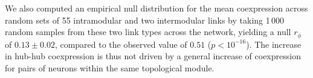 \documentclass[10pt,letterpaper]{article}
\begin{document}
We also computed an empirical null distribution for the mean coexpression across random sets of 55 intramodular and two intermodular links by taking 1\,000 random samples from these two link types across the network, yielding a null $r_\phi$ of $0.13 \pm 0.02$, compared to the observed value of $0.51$ ($p < 10^{-16}$).
The increase in hub-hub coexpression is thus not driven by a general increase of coexpression for pairs of neurons within the same topological module.

\end{document}

